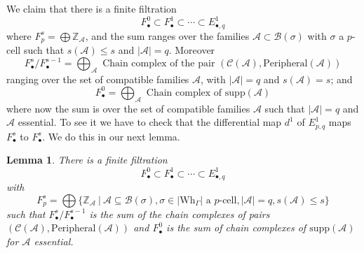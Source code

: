 \documentclass[a4paper]{amsart}
\newcommand{\G}{\Gamma}
\newcommand{\B}{\mathcal{B}}
\newcommand{\au}{\mathcal{A}}
\newcommand{\Wh}{\mathrm{Wh}}
\newcommand{\supp}{\mathrm{supp}}
\newcommand{\suppa}{\mathrm{supp}(\au)}
\newcommand{\peri}{\mathrm{Peripheral}}
\newtheorem{lem}[teo]{Lemma}
\theoremstyle{definition}
\theoremstyle{remark}
\begin{document}
We claim that there is a finite filtration
$$
F^0_{\bullet}\subset F^1_{\bullet} \subset \cdots \subset  E^1_{\bullet,q}
$$
  where $F_p^s=\bigoplus\mathbb{Z}_{\au}$, and the sum ranges over the families $\au\subset \B(\sigma)$ with $\sigma$ a $p$-cell such that $s(\au)\leq s$ and $|\au|=q$. Moreover
$$
F_\bullet^s/F^{s-1}_\bullet=\bigoplus_\au \textrm{ Chain complex of the pair }(\mathcal{C}(\au),\peri(\au))
$$
ranging over the set of  compatible families $\au$, with $|\au|=q$ and $s(\au)=s$; and 
$$
F^0_{\bullet}=\bigoplus_\au \textrm{ Chain complex of } \supp(\au)
$$
where now the sum is over the set of  compatible families $\au$ such that $|\au|=q$ and $\au$ essential.
To see it we have to check that the differential map $d^1$ of $E^1_{p,q}$ maps $F_\bullet^s$ to $F_\bullet^{s}$. We do this in our next lemma.






\begin{lem}
There is a finite filtration
$$
F^0_{\bullet}\subset F^1_{\bullet} \subset \cdots \subset  E^1_{\bullet,q}
$$
   with 
   $$F_p^s=\bigoplus\{\mathbb{Z}_{\au}\ |\ \au\subseteq\B(\sigma), \sigma\in|\Wh_\G| \textrm{ a }p\textrm{-cell}, |\au|=q, s(\au)\leq s\}$$ 
   such that $F_\bullet^s/F^{s-1}_\bullet$ is the sum of the chain complexes of pairs $(\mathcal{C}(\au),\peri(\au))$ and $
F^0_{\bullet}$ is the sum of chain complexes of $\suppa$ for $\au$ essential.

   
\end{lem}
\end{document}
